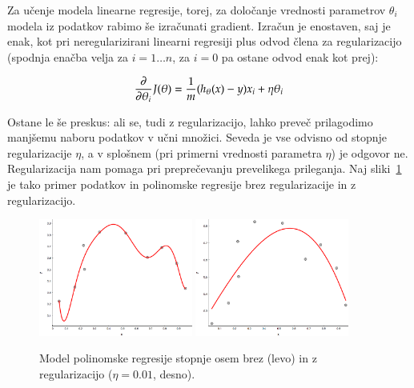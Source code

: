 Za učenje modela linearne regresije, torej, za določanje vrednosti parametrov $\theta_i$ modela iz podatkov rabimo še izračunati gradient. Izračun je enostaven, saj je enak, kot pri neregularizirani linearni regresiji plus odvod člena za regularizacijo (spodnja enačba velja za $i=1\ldots n$, za $i=0$ pa ostane odvod enak kot prej):

\begin{equation}
{\partial\over\partial\theta_i} J(\theta) = {1\over m}(h_\theta(x)-y)x_i + \eta\theta_i
\end{equation}

Ostane le še preskus: ali se, tudi z regularizacijo, lahko preveč prilagodimo manjšemu naboru podatkov v učni množici. Seveda je vse odvisno od stopnje regularizacije $\eta$, a v splošnem (pri primerni vrednosti parametra $\eta$) je odgovor ne. Regularizacija nam pomaga pri preprečevanju prevelikega prileganja. Naj sliki~\ref{fig:poly-reg-compare} je tako primer podatkov in polinomske regresije brez regularizacije in z regularizacijo.

\begin{figure}[htbp]
\begin{center}
  \includegraphics[width=0.45\textwidth]{slike/poly-reg-no.png}
  \hfill
  \includegraphics[width=0.45\textwidth]{slike/poly-reg-yes.png}
\caption{Model polinomske regresije stopnje osem brez (levo) in z regularizacijo ($\eta=0.01$, desno).}
\label{fig:poly-reg-compare}
\end{center}
\end{figure}
